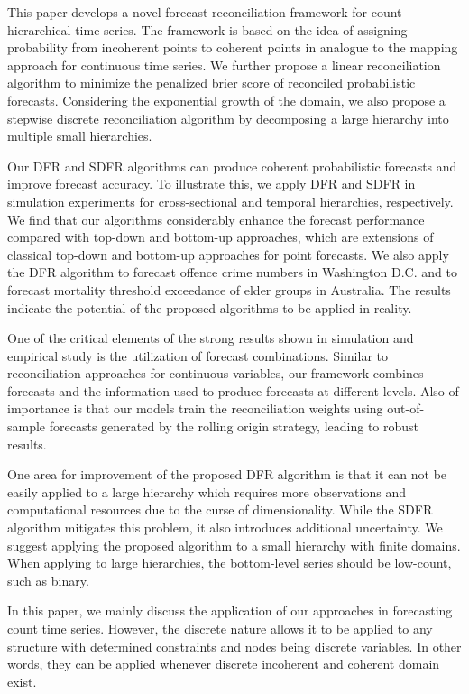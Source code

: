 \documentclass[a4paper,review,12pt,authoryear]{elsarticle}
\begin{document}
     This paper develops a novel forecast reconciliation framework for count hierarchical time series. 
     The framework is based on the idea of assigning probability from incoherent points to coherent points in analogue to the mapping approach for continuous time series.
     We further propose a linear reconciliation algorithm to minimize the penalized brier score of reconciled probabilistic forecasts.
     Considering the exponential growth of the domain, we also propose a stepwise discrete reconciliation algorithm by decomposing a large hierarchy into multiple small hierarchies.
     
     Our DFR and SDFR algorithms can produce coherent probabilistic forecasts and improve forecast accuracy. 
     To illustrate this, we apply DFR and SDFR in simulation experiments for cross-sectional and temporal hierarchies, respectively.
     We find that our algorithms considerably enhance the forecast performance compared with top-down and bottom-up approaches, which are extensions of classical top-down and bottom-up approaches for point forecasts.
     We also apply the DFR algorithm to forecast offence crime numbers in Washington D.C. and to forecast mortality threshold exceedance of elder groups in Australia. 
     The results indicate the potential of the proposed algorithms to be applied in reality.
     
     One of the critical elements of the strong results shown in simulation and empirical study is the utilization of forecast combinations.
     Similar to reconciliation approaches for continuous variables, our framework combines forecasts and the information used to produce forecasts at different levels.
     Also of importance is that our models train the reconciliation weights using out-of-sample forecasts generated by the rolling origin strategy, leading to robust results. 
     
     One area for improvement of the proposed DFR algorithm is that it can not be easily applied to a large hierarchy which requires more observations and computational resources due to the curse of dimensionality.
     While the SDFR algorithm mitigates this problem, it also introduces additional uncertainty. 
     We suggest applying the proposed algorithm to a small hierarchy with finite domains. 
     When applying to large hierarchies, the bottom-level series should be low-count, such as binary.
     
     In this paper, we mainly discuss the application of our approaches in forecasting count time series. 
     However, the discrete nature allows it to be applied to any structure with determined constraints and nodes being discrete variables.
     In other words, they can be applied whenever discrete incoherent and coherent domain exist. 
     
\end{document}
